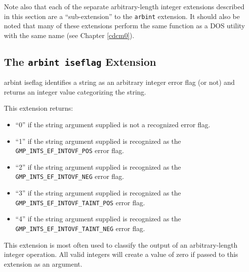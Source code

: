 Note also that each of the separate arbitrary-length integer extensions described
in this section are a ``sub-extension'' to the \texttt{arbint} extension.  It
should also be noted
that many of these extensions perform the same function as a DOS
utility with the same name (see Chapter \cdcmzeroxrefhyphen{}\ref{cdcm0}).


\subsection{The \texttt{arbint iseflag} Extension}

\begin{tclcommandname}{arbint iseflag}%
identifies a string as an arbitrary integer error flag (or not) and
returns an integer value categorizing the string.
\end{tclcommandname}

\begin{tclcommandsynopsis}
\end{tclcommandsynopsis}

\begin{tclcommanddescription}
This extension returns:
\begin{itemize}
\item ``0'' if the string argument supplied is not a recognized
      error flag.
\item ``1'' if the string argument supplied is recognized as the\\
      \texttt{GMP\_INTS\_EF\_INTOVF\_POS}
	  error flag.
\item ``2'' if the string argument supplied is recognized as the\\
      \texttt{GMP\_INTS\_EF\_INTOVF\_NEG}
	  error flag.
\item ``3'' if the string argument supplied is recognized as the\\
      \texttt{GMP\_INTS\_EF\_INTOVF\_TAINT\_POS}
	  error flag.
\item ``4'' if the string argument supplied is recognized as the\\
      \texttt{GMP\_INTS\_EF\_INTOVF\_TAINT\_NEG}
	  error flag.
\end{itemize}

This extension is most often used to classify the output of an
arbitrary-length integer operation.  All valid integers will create
a value of zero if passed to this extension as an argument.
\end{tclcommanddescription}

